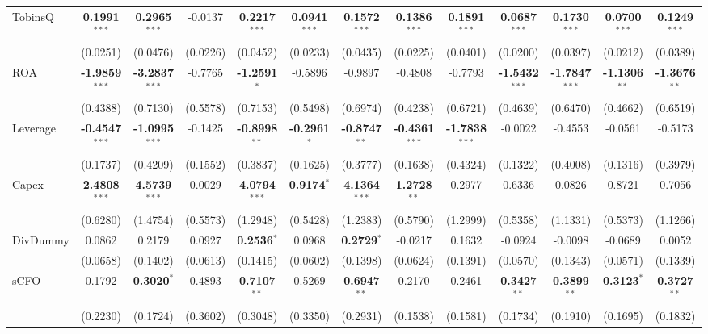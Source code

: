 \begin{landscape}
\begin{table}[H]
\begin{tabular}{lcccccccccccc}
TobinsQ & \textbf{0.1991}$^{***}$ & \textbf{0.2965}$^{***}$ & -0.0137 & \textbf{0.2217}$^{***}$ & \textbf{0.0941}$^{***}$ & \textbf{0.1572}$^{***}$ & \textbf{0.1386}$^{***}$ & \textbf{0.1891}$^{***}$ & \textbf{0.0687}$^{***}$ & \textbf{0.1730}$^{***}$ & \textbf{0.0700}$^{***}$ & \textbf{0.1249}$^{***}$ \\
 & (0.0251) & (0.0476) & (0.0226) & (0.0452) & (0.0233) & (0.0435) & (0.0225) & (0.0401) & (0.0200) & (0.0397) & (0.0212) & (0.0389) \\
ROA & \textbf{-1.9859}$^{***}$ & \textbf{-3.2837}$^{***}$ & -0.7765 & \textbf{-1.2591}$^{*}$ & -0.5896 & -0.9897 & -0.4808 & -0.7793 & \textbf{-1.5432}$^{***}$ & \textbf{-1.7847}$^{***}$ & \textbf{-1.1306}$^{**}$ & \textbf{-1.3676}$^{**}$ \\
 & (0.4388) & (0.7130) & (0.5578) & (0.7153) & (0.5498) & (0.6974) & (0.4238) & (0.6721) & (0.4639) & (0.6470) & (0.4662) & (0.6519) \\
Leverage & \textbf{-0.4547}$^{***}$ & \textbf{-1.0995}$^{***}$ & -0.1425 & \textbf{-0.8998}$^{**}$ & \textbf{-0.2961}$^{*}$ & \textbf{-0.8747}$^{**}$ & \textbf{-0.4361}$^{***}$ & \textbf{-1.7838}$^{***}$ & -0.0022 & -0.4553 & -0.0561 & -0.5173 \\
 & (0.1737) & (0.4209) & (0.1552) & (0.3837) & (0.1625) & (0.3777) & (0.1638) & (0.4324) & (0.1322) & (0.4008) & (0.1316) & (0.3979) \\
Capex & \textbf{2.4808}$^{***}$ & \textbf{4.5739}$^{***}$ & 0.0029 & \textbf{4.0794}$^{***}$ & \textbf{0.9174}$^{*}$ & \textbf{4.1364}$^{***}$ & \textbf{1.2728}$^{**}$ & 0.2977 & 0.6336 & 0.0826 & 0.8721 & 0.7056 \\
 & (0.6280) & (1.4754) & (0.5573) & (1.2948) & (0.5428) & (1.2383) & (0.5790) & (1.2999) & (0.5358) & (1.1331) & (0.5373) & (1.1266) \\
DivDummy & 0.0862 & 0.2179 & 0.0927 & \textbf{0.2536}$^{*}$ & 0.0968 & \textbf{0.2729}$^{*}$ & -0.0217 & 0.1632 & -0.0924 & -0.0098 & -0.0689 & 0.0052 \\
 & (0.0658) & (0.1402) & (0.0613) & (0.1415) & (0.0602) & (0.1398) & (0.0624) & (0.1391) & (0.0570) & (0.1343) & (0.0571) & (0.1339) \\
sCFO & 0.1792 & \textbf{0.3020}$^{*}$ & 0.4893 & \textbf{0.7107}$^{**}$ & 0.5269 & \textbf{0.6947}$^{**}$ & 0.2170 & 0.2461 & \textbf{0.3427}$^{**}$ & \textbf{0.3899}$^{**}$ & \textbf{0.3123}$^{*}$ & \textbf{0.3727}$^{**}$ \\
 & (0.2230) & (0.1724) & (0.3602) & (0.3048) & (0.3350) & (0.2931) & (0.1538) & (0.1581) & (0.1734) & (0.1910) & (0.1695) & (0.1832) \\

\end{tabular}
\end{table}
\end{landscape}
